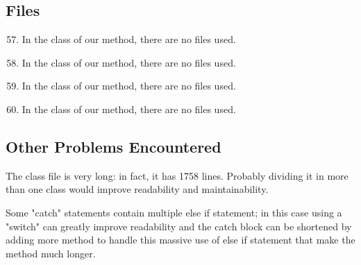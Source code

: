 \subsection{Files}
\begin{enumerate}
	\setcounter{enumi}{56}
	\item In the class of our method, there are no files used.
	\item In the class of our method, there are no files used.
	\item In the class of our method, there are no files used.
	\item In the class of our method, there are no files used.
\end{enumerate}
\subsection{Other Problems Encountered}
	The class file is very long: in fact, it has 1758 lines. Probably dividing it in more than one class would improve readability and maintainability.
	
	Some "catch" statements contain multiple \ttfamily else if \normalfont statement; in this case using a "switch" can greatly improve readability and the catch block can be shortened by adding more method to handle this massive use of else if statement that make the method much longer.